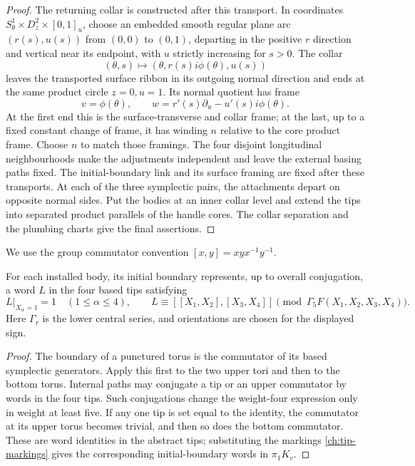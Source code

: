 \begin{proof}
The returning collar is constructed after this transport.  In
coordinates $S^1_\theta\times D^2_z\times[0,1]_u$, choose an embedded
smooth regular plane arc $(r(s),u(s))$ from $(0,0)$ to $(0,1)$, departing in the
positive $r$ direction and vertical near its endpoint, with $u$
strictly increasing for $s>0$.  The collar
\[
 (\theta,s)\longmapsto
       (\theta,r(s)i\phi(\theta),u(s))
\]
leaves the transported surface ribbon in its outgoing normal
direction and ends at the same product circle $z=0,u=1$.  Its
normal quotient has frame
\[
 v=\phi(\theta),\qquad
 w=r'(s)\partial_u-u'(s)i\phi(\theta).
\]
At the first end this is the surface-transverse and collar frame;
at the last, up to a fixed constant change of frame, it has winding
$n$ relative to the core product frame.
Choose $n$ to match those framings.  The four disjoint longitudinal
neighbourhoods make the adjustments independent and leave the
external basing paths fixed.  The initial-boundary link and its
surface framing are fixed after these transports.  At each of the
three symplectic pairs, the attachments depart on opposite normal
sides.  Put the bodies at an inner collar level and extend the tips
into separated product parallels of the handle cores.  The collar
separation and the plumbing charts give the final assertions.
\end{proof}

We use the group commutator convention $[x,y]=xyx^{-1}y^{-1}$.

\begin{lemma}
\label{ch:laws}
For each installed body, its initial boundary represents, up to overall
conjugation, a word $L$ in the four based tips satisfying
\begin{equation}
\label{ch:law-properties}
 L\big|_{X_\alpha=1}=1\quad(1\leq\alpha\leq4),
 \qquad
 L\equiv [[X_1,X_2],[X_3,X_4]]
       \pmod{\Gamma_5 F(X_1,X_2,X_3,X_4)}.
\end{equation}
Here $\Gamma_r$ is the lower central series, and orientations are
chosen for the displayed sign.
\end{lemma}

\begin{proof}
The boundary of a punctured torus is the commutator of its based
symplectic generators.  Apply this first to the two upper tori and
then to the bottom torus.  Internal paths may conjugate a tip or an
upper commutator by words in the four tips.  Such conjugations change
the weight-four expression only in weight at least five.  If any
one tip is set equal to the identity, the commutator at its upper
torus becomes trivial, and then so does the bottom commutator.
These are word identities in the abstract tips; substituting the
markings \eqref{ch:tip-markings} gives the corresponding
initial-boundary words in $\pi_1K_v$.
\end{proof}

